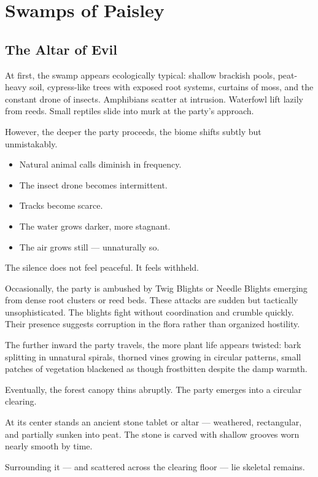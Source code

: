 \section*{Swamps of Paisley}
\subsection*{The Altar of Evil}
{\entryfont At first, the swamp appears ecologically typical: shallow brackish pools, peat-heavy soil, cypress-like trees with exposed root systems, curtains of moss, and the constant drone of insects. Amphibians scatter at intrusion. Waterfowl lift lazily from reeds. Small reptiles slide into murk at the party's approach.

However, the deeper the party proceeds, the biome shifts subtly but unmistakably.
\begin{itemize}
	\item Natural animal calls diminish in frequency.
	\item The insect drone becomes intermittent.
	\item Tracks become scarce.
	\item The water grows darker, more stagnant.
	\item The air grows still — unnaturally so.
\end{itemize}
The silence does not feel peaceful. It feels withheld.

Occasionally, the party is ambushed by Twig Blights or Needle Blights emerging from dense root clusters or reed beds. These attacks are sudden but tactically unsophisticated. The blights fight without coordination and crumble quickly. Their presence suggests corruption in the flora rather than organized hostility.

The further inward the party travels, the more plant life appears twisted: bark splitting in unnatural spirals, thorned vines growing in circular patterns, small patches of vegetation blackened as though frostbitten despite the damp warmth.

Eventually, the forest canopy thins abruptly. The party emerges into a circular clearing.

At its center stands an ancient stone tablet or altar — weathered, rectangular, and partially sunken into peat. The stone is carved with shallow grooves worn nearly smooth by time.

Surrounding it — and scattered across the clearing floor — lie skeletal remains.

}
